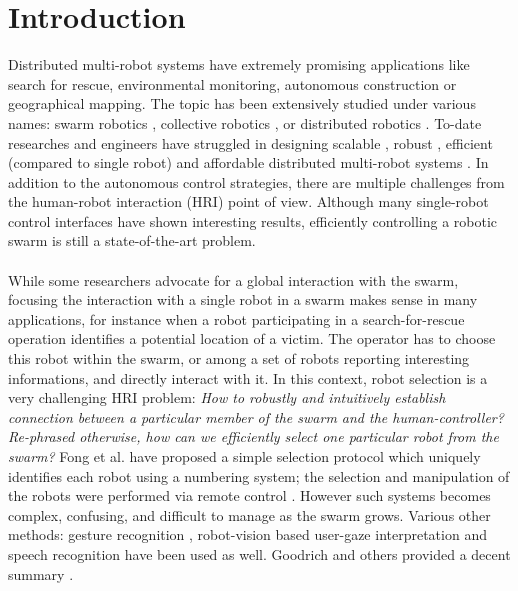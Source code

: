 \documentclass{svmult}
\begin{document}

\section{Introduction}
\label{sec:introduction}
Distributed multi-robot systems have extremely promising applications like search for rescue, environmental monitoring, autonomous construction or geographical mapping. The topic has been extensively studied under various names: swarm robotics \cite{brambilla2013}, collective robotics \cite{kernbach2013handbook}, or distributed robotics \cite{martinoli2012distributed}. To-date researches and engineers have struggled in designing scalable \cite{rubenstein2012kilobot}, robust \cite{winfield2006safety}, efficient (compared to single robot) \cite{Bonani2012} and affordable distributed multi-robot systems \cite{rubenstein2014programmable}. In addition to the autonomous control strategies, there are multiple challenges from the human-robot interaction (HRI) point of view. Although many single-robot control interfaces have shown interesting results, efficiently controlling a robotic swarm is still a state-of-the-art problem.\\
\\
While some researchers advocate for a global interaction with the swarm, focusing the interaction with a single robot in a swarm makes sense in many applications, for instance when a robot participating in a search-for-rescue operation identifies a potential location of a victim. 
The operator has to choose this robot within the swarm, or among a set of robots reporting interesting informations, and directly interact with it. In this context, robot selection is a very challenging HRI problem: \textit{How to robustly and intuitively establish connection between a particular member of the swarm and the human-controller? Re-phrased otherwise, how can we efficiently select one particular robot from the swarm?} Fong et al. have proposed a simple selection protocol which uniquely identifies each robot using a numbering system; the selection and manipulation of the robots were performed via remote control \cite{fong2003}. However such systems becomes complex, confusing, and difficult to manage as the swarm grows. Various other methods: gesture recognition \cite{Nagietal2014, Jones2010, Couture-Beil2010, Monajjemi2013}, robot-vision based user-gaze interpretation \cite{Couture-Beil2010, Monajjemi2013, Pourmehr2013} and speech recognition \cite{Pourmehr2013} have been used as well. Goodrich and others provided a decent summary \cite{yanco2004classifying, goodrich2007human, Rule2012}.\\
\end{document}
